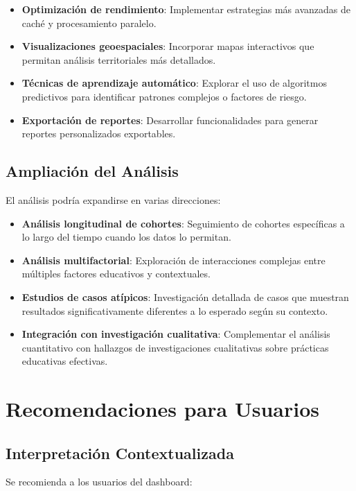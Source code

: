 \begin{itemize}
    \item \textbf{Optimización de rendimiento}: Implementar estrategias más avanzadas de caché y procesamiento paralelo.
    
    \item \textbf{Visualizaciones geoespaciales}: Incorporar mapas interactivos que permitan análisis territoriales más detallados.
    
    \item \textbf{Técnicas de aprendizaje automático}: Explorar el uso de algoritmos predictivos para identificar patrones complejos o factores de riesgo.
    
    \item \textbf{Exportación de reportes}: Desarrollar funcionalidades para generar reportes personalizados exportables.
\end{itemize}

\subsection{Ampliación del Análisis}
El análisis podría expandirse en varias direcciones:

\begin{itemize}
    \item \textbf{Análisis longitudinal de cohortes}: Seguimiento de cohortes específicas a lo largo del tiempo cuando los datos lo permitan.
    
    \item \textbf{Análisis multifactorial}: Exploración de interacciones complejas entre múltiples factores educativos y contextuales.
    
    \item \textbf{Estudios de casos atípicos}: Investigación detallada de casos que muestran resultados significativamente diferentes a lo esperado según su contexto.
    
    \item \textbf{Integración con investigación cualitativa}: Complementar el análisis cuantitativo con hallazgos de investigaciones cualitativas sobre prácticas educativas efectivas.
\end{itemize}

\section{Recomendaciones para Usuarios}

\subsection{Interpretación Contextualizada}
Se recomienda a los usuarios del dashboard:

